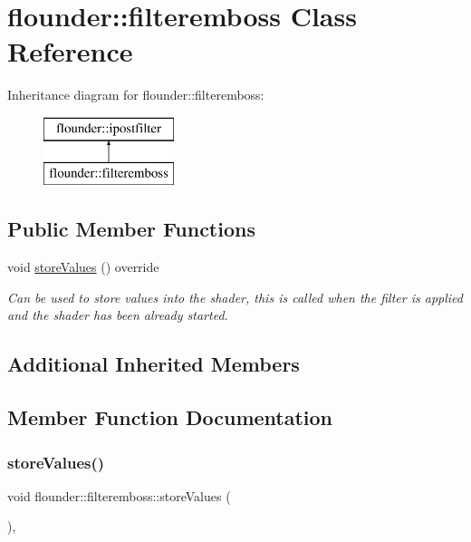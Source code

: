 \hypertarget{classflounder_1_1filteremboss}{}\section{flounder\+:\+:filteremboss Class Reference}
\label{classflounder_1_1filteremboss}
Inheritance diagram for flounder\+:\+:filteremboss\+:\begin{figure}[H]
\begin{center}
\leavevmode
\includegraphics[height=2.000000cm]{classflounder_1_1filteremboss}
\end{center}
\end{figure}
\subsection*{Public Member Functions}
\begin{DoxyCompactItemize}
\item 
void \hyperlink{classflounder_1_1filteremboss_aa0c7d249c2c830036904bede59dababf}{store\+Values} () override
\begin{DoxyCompactList}\small\item\em Can be used to store values into the shader, this is called when the filter is applied and the shader has been already started. \end{DoxyCompactList}\end{DoxyCompactItemize}
\subsection*{Additional Inherited Members}


\subsection{Member Function Documentation}
\mbox{\label{classflounder_1_1filteremboss_aa0c7d249c2c830036904bede59dababf}} 
\subsubsection{\texorpdfstring{store\+Values()}{storeValues()}}
{\footnotesize\ttfamily void flounder\+::filteremboss\+::store\+Values (\begin{DoxyParamCaption}{ }\end{DoxyParamCaption})\hspace{0.3cm}{\ttfamily [override]}, {\ttfamily [virtual]}}



